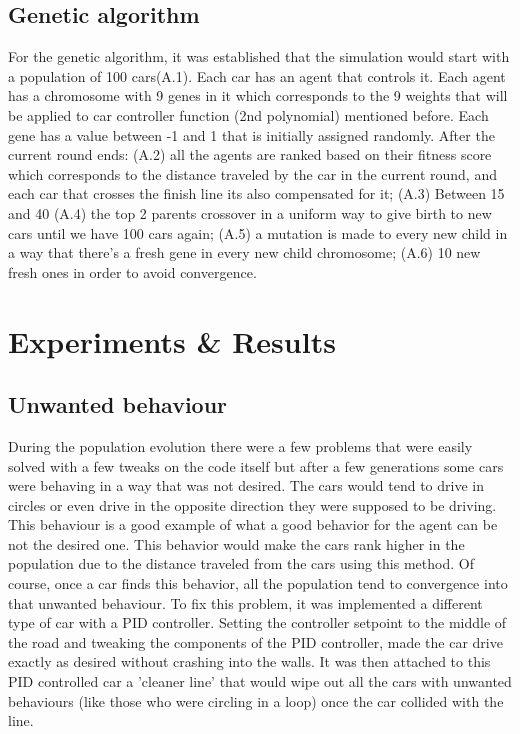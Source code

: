 \documentclass[conference]{IEEEtran}
\begin{document}
\subsection{Genetic algorithm}
For the genetic algorithm, it was established that the simulation would start with a population of 100 cars(A.1). Each car has an
agent that controls it. Each agent has a chromosome with 9 genes in it which corresponds to the 9 weights that will be applied to
car controller function (2nd polynomial) mentioned before.
Each gene has a value between -1 and 1 that is initially assigned randomly. After the current round ends: (A.2) all the agents are ranked
based on their fitness score which corresponds to the distance traveled by the car in the current round, and each car that crosses
the finish line its also compensated for it; (A.3) Between 15 and 40%
(A.4) the top 2 parents crossover in a uniform way to give birth to new cars until we have 100 cars again; (A.5) a mutation
is made to every new child in a way that there's a fresh gene in every new child chromosome; (A.6) 10%
new fresh ones in order to avoid convergence.

\section{Experiments \& Results}
\subsection{Unwanted behaviour}
During the population evolution there were a few problems that were easily solved with a few tweaks on the code itself but after a few generations
some cars were behaving in a way that was not desired. The cars would tend to drive in circles or even drive in the opposite direction they were supposed to
be driving. This behaviour is a good example of what a good behavior for the agent can be not the desired one. This behavior would make the cars rank higher
in the population due to the distance traveled from the cars using this method. Of course, once a car finds this behavior, all the population tend to convergence
into that unwanted behaviour. To fix this problem, it was implemented a different type of car with a PID controller. Setting the controller setpoint
to the middle of the road and tweaking the components of the PID controller, made the car drive exactly as desired without crashing into the walls.
It was then attached to this PID controlled car a 'cleaner line' that would wipe out all the cars with unwanted behaviours (like those who were circling in a loop)
once the car collided with the line.
\end{document}
